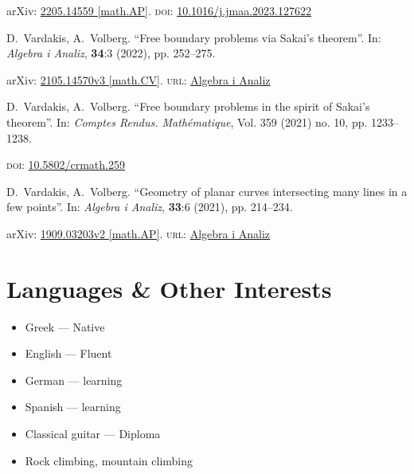 \documentclass[12pt]{article}
\begin{document}
arXiv: \href{https://arxiv.org/abs/2205.14559}{2205.14559 [math.AP]}.
\textsc{doi}: \href{https://doi.org/10.1016/j.jmaa.2023.127622}{10.1016/j.jmaa.2023.127622}
\medskip


D.~Vardakis, A.~Volberg.
\enquote{Free boundary problems via Sakai's theorem}.
In: \emph{Algebra i Analiz}, \textbf{34}:3 (2022), pp. 252--275.

arXiv: \href{https://arxiv.org/abs/2105.14570v3}{2105.14570v3 [math.CV]}.
\textsc{url}: \href{http://www.mathnet.ru/php/archive.phtml?wshow=paper&jrnid=aa&paperid=1818&option_lang=eng}{Algebra i Analiz}
\medskip


D.~Vardakis, A.~Volberg.
\enquote{Free boundary problems in the spirit of Sakai’s theorem}.
In: \emph{Comptes Rendus. Math{\'e}matique}, Vol. 359 (2021) no. 10, pp. 1233--1238.

\textsc{doi}: \href{https://doi.org/10.5802/crmath.259}{10.5802/crmath.259} %
\medskip


D.~Vardakis, A.~Volberg.
\enquote{Geometry of planar curves intersecting many lines in a few points}.
In: \emph{Algebra i Analiz}, \textbf{33}:6 (2021), pp. 214--234.

arXiv: \href{https://arxiv.org/abs/1909.03203v2}{1909.03203v2 [math.AP]}.
\textsc{url}: \href{http://mi.mathnet.ru/eng/aa/v33/i6/p214}{Algebra i Analiz}


\section*{Languages \& Other Interests}

\begin{multicols}{2}
	\begin{itemize}
		\item Greek --- Native
		\item English --- Fluent
		\item German --- learning
		\item Spanish --- learning
		\item Classical guitar --- Diploma
		\item Rock climbing, mountain climbing
	\end{itemize}
\end{multicols}
\end{document}
